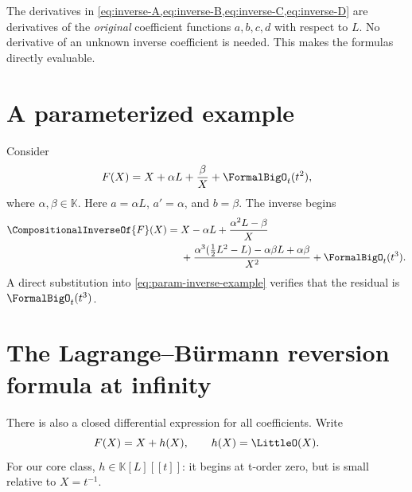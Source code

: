 \documentclass[11pt,openany]{book}
\theoremstyle{definition}
\theoremstyle{plain}
\theoremstyle{remark}
\newcommand{\K}{\mathbb{K}}
\newcommand{\rev}[1]{\CompositionalInverseOf{#1}}
\begin{document}
\begin{checkpointbox}
The derivatives in \cref{eq:inverse-A,eq:inverse-B,eq:inverse-C,eq:inverse-D}
are derivatives of the \emph{original} coefficient functions \(a,b,c,d\) with
respect to \(L\).  No derivative of an unknown inverse coefficient is needed.
This makes the formulas directly evaluable.
\end{checkpointbox}

\section{A parameterized example}
Consider
\begin{equation}\label{eq:param-inverse-example}
 F(X)=X+\alpha L+\frac{\beta}{X}+\FormalBigO_t(t^2),
\end{equation}
where \(\alpha,\beta\in\K\).  Here \(a=\alpha L\), \(a'=\alpha\), and
\(b=\beta\).  The inverse begins
\begin{equation}\label{eq:param-inverse-result}
\begin{split}
 \rev{F}(X)={}&X-\alpha L
 +\frac{\alpha^2L-\beta}{X}\\
 &+\frac{\alpha^3(\tfrac12L^2-L)-\alpha\beta L+\alpha\beta}{X^2}
 +\FormalBigO_t(t^3).
\end{split}
\end{equation}
A direct substitution into \cref{eq:param-inverse-example} verifies that the
residual is \(\FormalBigO_t(t^3)\).

\section{The Lagrange--Bürmann reversion formula at infinity}
There is also a closed differential expression for all coefficients.  Write
\begin{equation}\label{eq:F-x-plus-h}
 F(X)=X+h(X),
 \qquad h(X)=\LittleO(X).
\end{equation}
For our core class, \(h\in\K[L][[t]]\): it begins at t-order zero, but is small
relative to \(X=t^{-1}\).
\end{document}
